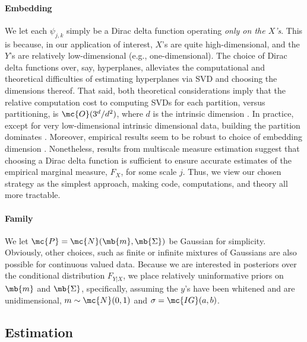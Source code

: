 \paragraph{Embedding} We let each $\psi_{j,k}$ simply be a Dirac delta function operating \emph{only on the $X$'s}.  This is because, in our application of interest, $X$'s are quite high-dimensional, and the $Y$'s are relatively low-dimensional (e.g., one-dimensional).  The choice of Dirac delta functions over, say, hyperplanes, alleviates the computational and theoretical difficulties of estimating hyperplanes via SVD and choosing the dimensions thereof. That said, both theoretical considerations imply that the relative computation cost to computing SVDs for each partition, versus partitioning, is  
$\mc{O}(3^d/d^2)$, where $d$ is the intrinsic dimension \cite{Allard2012}. In practice, except for very low-dimensional intrinsic dimensional data, building the partition dominates \cite{Allard2012}.  Moreover, empirical results seem to be robust to choice of embedding dimension \cite{Lawlor2012}. Nonetheless, results from multiscale measure estimation \cite{ChenMaggioni12} suggest that choosing a Dirac delta function is sufficient to ensure accurate estimates of the empirical marginal measure, $F_X$, for some scale $j$.  Thus, we view our chosen strategy as the simplest approach, making code, computations, and theory all more tractable.  


\paragraph{Family} We let $\mc{P}=\mc{N}(\mb{m},\mb{\Sigma})$ be Gaussian for simplicity. Obviously, other choices, such as finite or infinite mixtures of Gaussians are also possible for continuous valued data.  Because we are interested in posteriors over the conditional distribution $F_{Y|X}$, we place relatively uninformative priors on $\mb{m}$ and $\mb{\Sigma}$, specifically, assuming the $y$'s have been whitened and are unidimensional,  
$m \sim \mc{N}(0,1)$ and $\sigma=\mc{IG}(a,b)$.




\subsection{Estimation}


